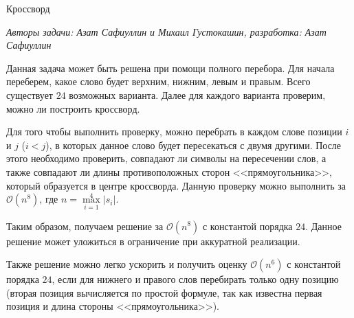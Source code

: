 \begin{tutorial}{Кроссворд}

\medskip
\textit{Авторы задачи: Азат Сафиуллин и Михаил Густокашин, разработка: Азат Сафиуллин}
\medskip

Данная задача может быть решена при помощи полного перебора. Для начала переберем, какое слово будет верхним, нижним, левым и правым. Всего существует $24$ возможных варианта. Далее для каждого варианта проверим, можно ли построить кроссворд.

Для того чтобы выполнить проверку, можно перебрать в каждом слове позиции $i$ и $j$ ($i < j$), в которых данное слово будет пересекаться с двумя другими. После этого необходимо проверить, совпадают ли символы на пересечении слов, а также совпадают ли длины противоположных сторон <<прямоугольника>>, который образуется в центре кроссворда. Данную проверку можно выполнить за $\mathcal{O}(n^8)$, где $n = \max\limits_{i=1}^{4} \lvert s_i \rvert$.

Таким образом, получаем решение за $\mathcal{O}(n^8)$ с константой порядка $24$. Данное решение может уложиться в ограничение при аккуратной реализации.

Также решение можно легко ускорить и получить оценку $\mathcal{O}(n^6)$ с константой порядка $24$, если для нижнего и правого слов перебирать только одну позицию (вторая позиция вычисляется по простой формуле, так как известна первая позиция и длина стороны <<прямоугольника>>).

\end{tutorial}

